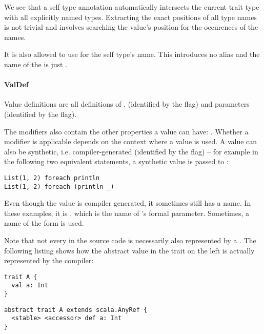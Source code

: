 We see that a self type annotation automatically intersects the current trait type with all explicitly named types. Extracting the exact positions of all type names is not trivial and involves searching the value's position for the occurences of the names.

It is also allowed to use  for the self type's name. This introduces no alias and the name of the  is just \src{\_}.

\paragraph{ValDef} 

\noindent Value definitions are all definitions of ,  (identified by the  flag) and parameters (identified by the  flag).

The modifiers also contain the other properties a value can have: . Whether a modifier is applicable depends on the context where a value is used. A value can also be synthetic, i.e. compiler-generated (identified by the  flag) -- for example in the following two equivalent statements, a synthetic value is passed to :

\begin{lstlisting}
List(1, 2) foreach println
List(1, 2) foreach (println _)
\end{lstlisting}

Even though the value is compiler generated, it sometimes still has a name. In these examples, it is , which is the name of 's formal parameter. Sometimes, a name of the form  is used.

Note that not every  in the source code is necessarily also represented by a . The following listing shows how the abstract value in the trait on the left is actually represented by the compiler:

\begin{multicols}{2}
\begin{lstlisting}
trait A {
  val a: Int
}
\end{lstlisting}
\begin{lstlisting}
abstract trait A extends scala.AnyRef {
  <stable> <accessor> def a: Int
}
\end{lstlisting}
\end{multicols}

